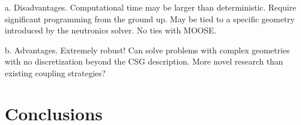 \documentclass[11pt]{article}
\begin{document}
a.	Disadvantages.  Computational time may be larger than deterministic.  Require significant programming from the ground up.  May be tied to a specific geometry introduced by the neutronics solver.  No ties with MOOSE.

b.	Advantages.  Extremely robust!  Can solve problems with complex geometries with no discretization beyond the CSG description.  More novel research than existing coupling strategies?

\section{Conclusions}



\end{document}

